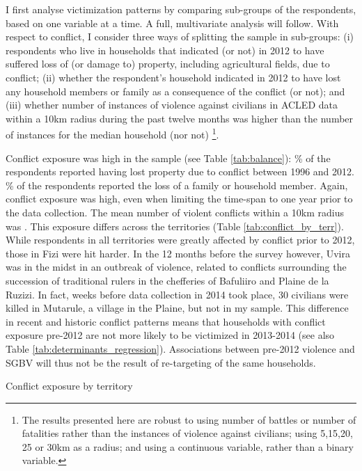I first analyse victimization patterns by comparing sub-groups of the respondents, based on one variable at a time. A full, multivariate analysis will follow. With respect to conflict, I consider three ways of splitting the sample in sub-groups: (i) respondents who live in households that indicated (or not) in 2012 to have suffered loss of (or damage to) property, including agricultural fields, due to conflict; (ii) whether the respondent's household indicated in 2012 to have lost any household members or family as a consequence of the conflict (or not); and (iii) whether number of instances of violence against civilians in ACLED data within a 10km radius during the past twelve months was higher than the number of instances for the median household (nor not) \footnote{The results presented here are robust to using number of battles or number of fatalities rather than the instances of violence against civilians; using 5,15,20, 25 or 30km as a radius; and using a continuous variable, rather than a binary variable.}. 

Conflict exposure was high in the sample (see Table \ref{tab:balance}): \% of the respondents reported having lost property due to conflict between 1996 and 2012.  \% of the respondents reported the loss of a family or household member. Again, conflict exposure was high, even when limiting the time-span to one year prior to the data collection. The mean number of violent conflicts within a 10km radius was . This exposure differs across the territories (Table \ref{tab:conflict_by_terr}). While respondents in all territories were greatly affected by conflict prior to 2012, those in Fizi were hit harder. In the 12 months before the survey however, Uvira was in the midst in an outbreak of violence, related to conflicts surrounding the succession of traditional rulers in the chefferies of Bafuliiro and Plaine de la Ruzizi. In fact, weeks before data collection in 2014 took place, 30 civilians were killed in Mutarule, a village in the Plaine, but not in my sample. This difference in recent and historic conflict patterns means that households with conflict exposure pre-2012 are not more likely to be victimized in 2013-2014 (see also Table \ref{tab:determinants_regression}). Associations between pre-2012 violence and SGBV will thus not be the result of re-targeting of the same households.

\begin{table}[htb]
\centering
\caption{Conflict exposure by territory }
\label{tab:conflict_by_terr}

\end{table}

